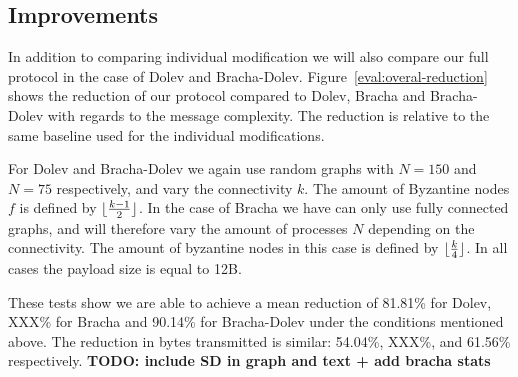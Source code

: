 
\subsection{Improvements}
In addition to comparing individual modification we will also compare our full protocol in the case of Dolev and Bracha-Dolev. Figure~\ref{eval:overal-reduction} shows the reduction of our protocol compared to Dolev, Bracha and Bracha-Dolev with regards to the message complexity. The reduction is relative to the same baseline used for the individual modifications.

For Dolev and Bracha-Dolev we again use random graphs with $N=150$ and $N=75$ respectively, and vary the connectivity $k$. The amount of Byzantine nodes $f$ is defined by $\lfloor\frac{k-1}{2}\rfloor$. In the case of Bracha we have can only use fully connected graphs, and will therefore vary the amount of processes $N$ depending on the connectivity. The amount of byzantine nodes in this case is defined by $\lfloor\frac{k}{4}\rfloor$. In all cases the payload size is equal to 12B. 

These tests show we are able to achieve a mean reduction of 81.81\% for Dolev, XXX\% for Bracha and 90.14\% for Bracha-Dolev under the conditions mentioned above. The reduction in bytes transmitted is similar: 54.04\%, XXX\%, and 61.56\% respectively. \textbf{TODO: include SD in graph and text + add bracha stats}

